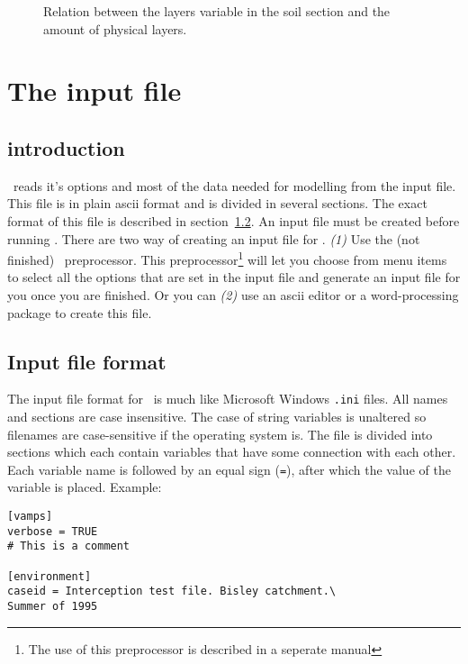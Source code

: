 \begin{figure}
\centerline{}
\caption{Relation between the layers variable in the soil section and
the amount of physical layers.}
\label{fig:layers}
\end{figure}


\chapter{The input file}

\section{introduction}

\vamps\ reads it's options and  most of the  data needed for  modelling
from the input file. This file is in plain ascii format and is divided in
several sections. The exact format of this file is described in
section~\ref{sec:inputfileformat}.  An input file must be created before
running \vamps.  There are two way of creating an input file for \vamps.
{\em (1)} Use the (not finished) \vamps\ preprocessor. This
preprocessor\footnote{The use of this preprocessor is described in a
seperate manual} will let you choose from menu items to select all the
options that are set in the input file and generate an input file for you
once you are finished. Or you can {\em (2)} use an ascii editor or a
word-processing package to create this file.



\section{Input file format}\label{sec:inputfileformat}
The input file format for \vamps\ is much like Microsoft Windows {\tt .ini}
files.  All names and sections are case insensitive.  The case of string
variables is unaltered so filenames are case-sensitive if the operating
system is. The file is divided into sections which each contain variables
that have some connection with each other.  Each variable name is followed
by an equal sign ({\tt =}), after which the value of the variable is placed.
Example:

\begin{verbatim}
[vamps] 
verbose = TRUE 
# This is a comment

[environment]
caseid = Interception test file. Bisley catchment.\
Summer of 1995
\end{verbatim}

